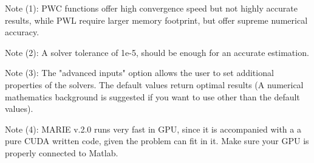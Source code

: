 \documentclass[10pt,a4paper]{article}
\author{Ilias Giannakopoulos}
\begin{document}
Note (1): PWC functions offer high convergence speed but not highly accurate results, while PWL require larger memory footprint, but offer supreme numerical accuracy.

Note (2): A solver tolerance of 1e-5, should be enough for an accurate estimation.

Note (3): The "advanced inputs" option allows the user to set additional properties of the solvers. The default values return optimal results (A numerical mathematics background is suggested if you want to use other than the default values).

Note (4): MARIE v.2.0 runs very fast in GPU, since it is accompanied with a a pure CUDA written code, given the problem can fit in it. Make sure your GPU is properly connected to Matlab.
\end{document}
